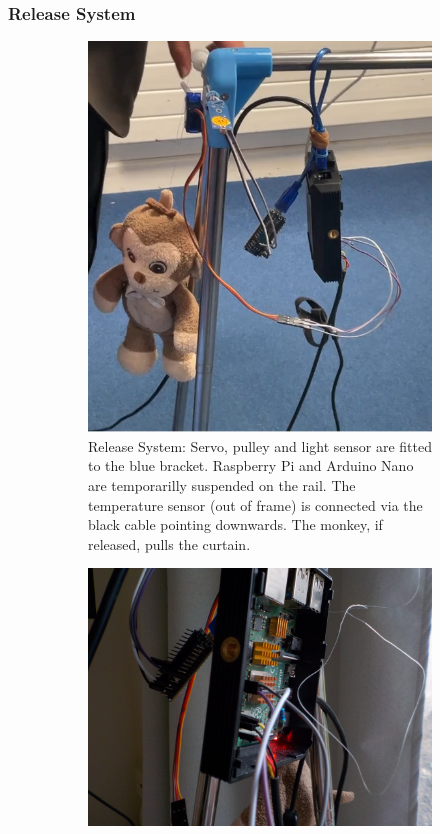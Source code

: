 \documentclass[a4paper,12pt]{article}
\begin{document}
\subsubsection{Release System}

\begin{figure}
    \centering
    \begin{subfigure}{0.45\textwidth}
        \includegraphics[width=\linewidth]{figures/curtainDetailViewSide.png}
        \caption{Release System: Servo, pulley and light sensor are fitted to the blue bracket. 
        Raspberry Pi and Arduino Nano are temporarilly suspended on the rail. 
        The temperature sensor (out of frame) is connected via the black cable pointing downwards.
        The monkey, if released, pulls the curtain. }
    \end{subfigure}
        \begin{subfigure}{0.5\textwidth}
        \includegraphics[width=\linewidth]{figures/wireSalat1.png}

\end{subfigure}
\end{figure}
\end{document}
